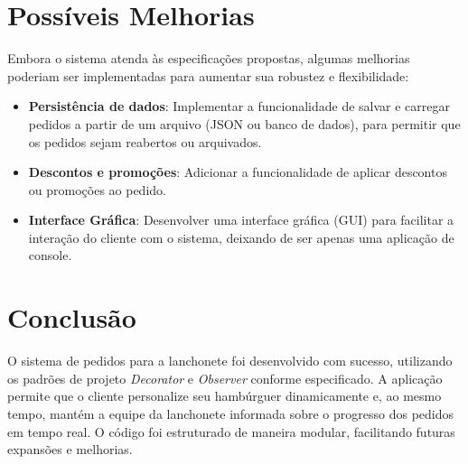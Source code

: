 \documentclass[a4paper,12pt]{article}
\begin{document}
\section{Possíveis Melhorias}
Embora o sistema atenda às especificações propostas, algumas melhorias poderiam ser implementadas para aumentar sua robustez e flexibilidade:

\begin{itemize}
    \item \textbf{Persistência de dados}: Implementar a funcionalidade de salvar e carregar pedidos a partir de um arquivo (JSON ou banco de dados), para permitir que os pedidos sejam reabertos ou arquivados.
    \item \textbf{Descontos e promoções}: Adicionar a funcionalidade de aplicar descontos ou promoções ao pedido.
    \item \textbf{Interface Gráfica}: Desenvolver uma interface gráfica (GUI) para facilitar a interação do cliente com o sistema, deixando de ser apenas uma aplicação de console.
\end{itemize}

\section{Conclusão}
O sistema de pedidos para a lanchonete foi desenvolvido com sucesso, utilizando os padrões de projeto \textit{Decorator} e \textit{Observer} conforme especificado. A aplicação permite que o cliente personalize seu hambúrguer dinamicamente e, ao mesmo tempo, mantém a equipe da lanchonete informada sobre o progresso dos pedidos em tempo real. O código foi estruturado de maneira modular, facilitando futuras expansões e melhorias.
\end{document}
